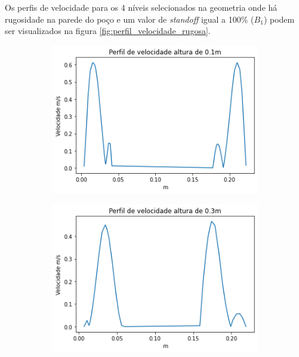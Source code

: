 Os perfis de velocidade para os 4 níveis selecionados na geometria onde há rugosidade na parede do poço e um valor de \textit{standoff} igual a 100\% ($B_1$) podem ser visualizados na figura \ref{fig:perfil_velocidade_rugosa}.
    \begin{figure}[H]
        \centering
    	\begin{subfigure}[b]{0.42\linewidth}
    		\includegraphics[width=\linewidth]{img/perfil_vel/rugoso/perfil_velocidade_rugoso_100.png}
    	\end{subfigure}
    	\begin{subfigure}[b]{0.42\linewidth}
    		\includegraphics[width=\linewidth]{img/perfil_vel/rugoso/perfil_velocidade_rugoso_300.png}
    	\end{subfigure}
    	\\

\end{figure}
